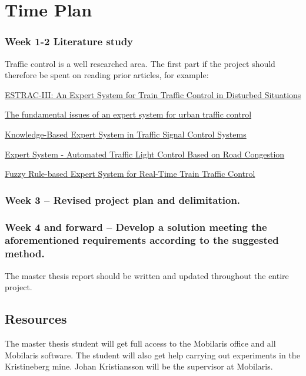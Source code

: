 \documentclass{article}
\begin{document}
\section*{Time Plan}
\subsubsection*{Week 1-2 Literature study}

Traffic control is a well researched area. The first part if the project should therefore be spent on reading prior articles, for example:

\href{https://www.sciencedirect.com/science/article/pii/S1474667017526646}{ESTRAC-III: An Expert System for Train Traffic Control in Disturbed Situations}

\href{https://ieeexplore.ieee.org/document/208646/}{The fundamental issues of an expert system for urban traffic control}

\href{http://s-space.snu.ac.kr/bitstream/10371/90495/1/5.Knowledge-Based_Expert_System_in_Traffic_Signal_Control_Systems..pdf}{Knowledge-Based Expert System in Traffic Signal Control Systems}

\href{https://www.slideshare.net/KartikShenoy1/expert-system-automated-traffic-light-control-based-on-road-congestion}{Expert System - Automated Traffic Light Control Based on Road Congestion}

\href{https://link.springer.com/chapter/10.1007/978-1-4471-0575-6_8}{Fuzzy Rule-based Expert System for Real-Time Train Traffic Control}

\subsubsection*{Week 3 – Revised project plan and delimitation.}

\subsubsection*{Week 4 and forward – Develop a solution meeting the aforementioned requirements according to the suggested method.}

The master thesis report should be written and updated throughout the entire project.

\subsection*{Resources}
The master thesis student will get full access to the Mobilaris office and all Mobilaris software. The student will also get help carrying out experiments in the Kristineberg mine. Johan Kristiansson will be the supervisor at Mobilaris.
\end{document}
